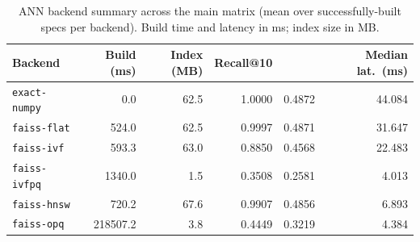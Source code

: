\begin{table}[t]
\centering
\small
\caption{ANN backend summary across the main matrix (mean over successfully-built specs per backend). Build time and latency in ms; index size in MB.}
\label{tab:ann-backends}
\begin{tabular}{lrrrrr}
\toprule
Backend & Build (ms) & Index (MB) & Recall@10 & \ndcg{} & Median lat.\ (ms) \\
\midrule
\texttt{exact-numpy} & 0.0 & 62.5 & 1.0000 & 0.4872 & 44.084 \\
\texttt{faiss-flat} & 524.0 & 62.5 & 0.9997 & 0.4871 & 31.647 \\
\texttt{faiss-ivf} & 593.3 & 63.0 & 0.8850 & 0.4568 & 22.483 \\
\texttt{faiss-ivfpq} & 1340.0 & 1.5 & 0.3508 & 0.2581 & 4.013 \\
\texttt{faiss-hnsw} & 720.2 & 67.6 & 0.9907 & 0.4856 & 6.893 \\
\texttt{faiss-opq} & 218507.2 & 3.8 & 0.4449 & 0.3219 & 4.384 \\
\bottomrule
\end{tabular}
\end{table}
